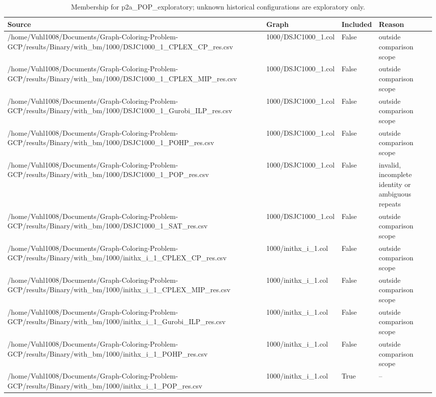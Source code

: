 \begin{table}[htbp]
\centering
\caption{Membership for p2a\_POP\_exploratory; unknown historical configurations are exploratory only.}
\label{tab:p2a-POP-exploratory-membership}
\begin{tabular}{llll}
\hline
Source & Graph & Included & Reason \\
\hline
/home/Vuhl1008/Documents/Graph-Coloring-Problem-GCP/results/Binary/with\_bm/1000/DSJC1000\_1\_CPLEX\_CP\_res.csv & 1000/DSJC1000\_1.col & False & outside comparison scope \\
/home/Vuhl1008/Documents/Graph-Coloring-Problem-GCP/results/Binary/with\_bm/1000/DSJC1000\_1\_CPLEX\_MIP\_res.csv & 1000/DSJC1000\_1.col & False & outside comparison scope \\
/home/Vuhl1008/Documents/Graph-Coloring-Problem-GCP/results/Binary/with\_bm/1000/DSJC1000\_1\_Gurobi\_ILP\_res.csv & 1000/DSJC1000\_1.col & False & outside comparison scope \\
/home/Vuhl1008/Documents/Graph-Coloring-Problem-GCP/results/Binary/with\_bm/1000/DSJC1000\_1\_POHP\_res.csv & 1000/DSJC1000\_1.col & False & outside comparison scope \\
/home/Vuhl1008/Documents/Graph-Coloring-Problem-GCP/results/Binary/with\_bm/1000/DSJC1000\_1\_POP\_res.csv & 1000/DSJC1000\_1.col & False & invalid, incomplete identity or ambiguous repeats \\
/home/Vuhl1008/Documents/Graph-Coloring-Problem-GCP/results/Binary/with\_bm/1000/DSJC1000\_1\_SAT\_res.csv & 1000/DSJC1000\_1.col & False & outside comparison scope \\
/home/Vuhl1008/Documents/Graph-Coloring-Problem-GCP/results/Binary/with\_bm/1000/inithx\_i\_1\_CPLEX\_CP\_res.csv & 1000/inithx\_i\_1.col & False & outside comparison scope \\
/home/Vuhl1008/Documents/Graph-Coloring-Problem-GCP/results/Binary/with\_bm/1000/inithx\_i\_1\_CPLEX\_MIP\_res.csv & 1000/inithx\_i\_1.col & False & outside comparison scope \\
/home/Vuhl1008/Documents/Graph-Coloring-Problem-GCP/results/Binary/with\_bm/1000/inithx\_i\_1\_Gurobi\_ILP\_res.csv & 1000/inithx\_i\_1.col & False & outside comparison scope \\
/home/Vuhl1008/Documents/Graph-Coloring-Problem-GCP/results/Binary/with\_bm/1000/inithx\_i\_1\_POHP\_res.csv & 1000/inithx\_i\_1.col & False & outside comparison scope \\
/home/Vuhl1008/Documents/Graph-Coloring-Problem-GCP/results/Binary/with\_bm/1000/inithx\_i\_1\_POP\_res.csv & 1000/inithx\_i\_1.col & True & -- \\

\end{tabular}
\end{table}
